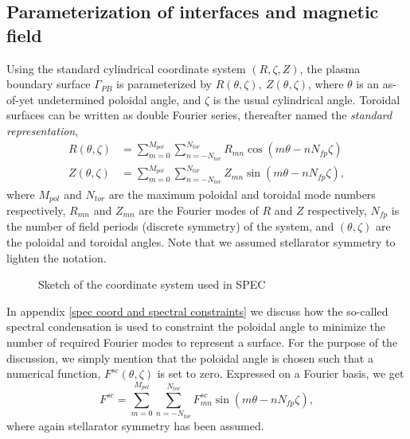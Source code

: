 \documentclass[my_thesis.tex]{subfiles}
\begin{document}
\subsection{Parameterization of interfaces and magnetic field}
Using the standard cylindrical coordinate system $(R,\zeta,Z)$, the plasma boundary surface $\Gamma_{PB}$ is parameterized by $R(\theta,\zeta),\ Z(\theta,\zeta)$, where $\theta$ is an as-of-yet undetermined poloidal angle, and $\zeta$ is the usual cylindrical angle. Toroidal surfaces can be written as double Fourier series, thereafter named the \emph{standard representation},
\begin{align}
	{R}(\theta,\zeta) &= \sum_{m=0}^{M_{pol}}\sum_{n=-N_{tor}}^{N_{tor}} R_{mn}\cos(m\theta-nN_{fp}\zeta) \label{eq.toroidal surface 1}\\
	{Z}(\theta,\zeta) &= \sum_{m=0}^{M_{pol}}\sum_{n=-N_{tor}}^{N_{tor}} Z_{mn}\sin(m\theta-nN_{fp}\zeta) \label{eq.toroidal surface 2},
\end{align}
where $M_{pol}$ and $N_{tor}$ are the maximum poloidal and toroidal mode numbers respectively, $R_{mn}$ and $Z_{mn}$ are the Fourier modes of $R$ and $Z$ respectively, $N_{fp}$ is the number of field periods (discrete symmetry) of the system, and $(\theta,\zeta)$ are the poloidal and toroidal angles. Note that we assumed stellarator symmetry \citep{pfefferleEnergeticIonDynamics2015} to lighten the notation.

\begin{figure}
	\centering
	\caption{Sketch of the coordinate system used in SPEC}
	\label{fig.spec coordinates}
\end{figure}

In appendix \ref{spec coord and spectral constraints} we discuss how the so-called spectral condensation is used to constraint the poloidal angle to minimize the number of required Fourier modes to represent a surface. For the purpose of the discussion, we simply mention that the poloidal angle is chosen such that a numerical function, $F^{sc}(\theta,\zeta)$ is set to zero. Expressed on a Fourier basis, we get
\begin{equation}
	F^{sc} = \sum_{m=0}^{M_{pol}}\sum_{n=-N_{tor}}^{N_{tor}} F^{sc}_{mn}\sin(m\theta-nN_{fp}\zeta),\label{eq. txt spectral constraint}
\end{equation}
where again stellarator symmetry has been assumed.
\end{document}
